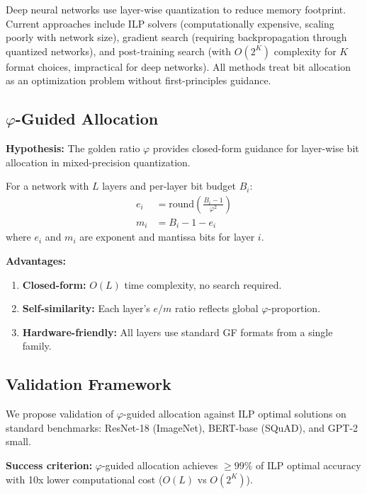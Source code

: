 \documentclass{article}
\begin{document}
Deep neural networks use layer-wise quantization to reduce memory footprint. Current approaches include ILP solvers (computationally expensive, scaling poorly with network size), gradient search (requiring backpropagation through quantized networks), and post-training search (with $O(2^K)$ complexity for $K$ format choices, impractical for deep networks). All methods treat bit allocation as an optimization problem without first-principles guidance.

\subsection{$\varphi$-Guided Allocation}

\textbf{Hypothesis:} The golden ratio $\varphi$ provides closed-form guidance for layer-wise bit allocation in mixed-precision quantization.

For a network with $L$ layers and per-layer bit budget $B_i$:
\begin{align}
e_i &= \text{round}\left(\frac{B_i - 1}{\varphi^2}\right) \\
m_i &= B_i - 1 - e_i
\end{align}
where $e_i$ and $m_i$ are exponent and mantissa bits for layer $i$.

\textbf{Advantages:}
\begin{enumerate}
    \item \textbf{Closed-form:} $O(L)$ time complexity, no search required.
    \item \textbf{Self-similarity:} Each layer's $e/m$ ratio reflects global $\varphi$-proportion.
    \item \textbf{Hardware-friendly:} All layers use standard GF formats from a single family.
\end{enumerate}

\subsection{Validation Framework}

We propose validation of $\varphi$-guided allocation against ILP optimal solutions on standard benchmarks: ResNet-18 (ImageNet), BERT-base (SQuAD), and GPT-2 small.

\textbf{Success criterion:} $\varphi$-guided allocation achieves $\geq 99\%$ of ILP optimal accuracy with 10x lower computational cost ($O(L)$ vs $O(2^K)$).

\end{document}
